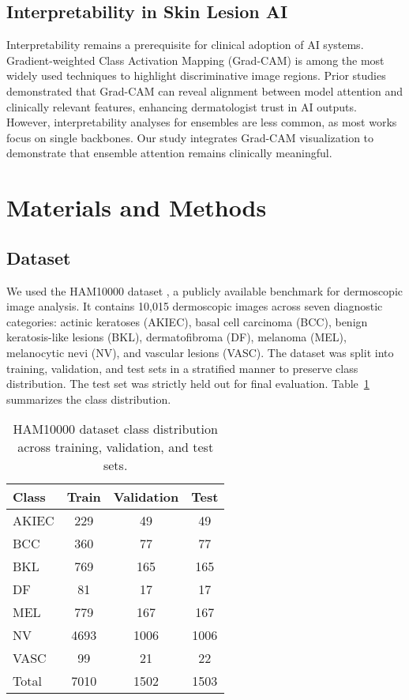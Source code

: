 \documentclass[preprint,12pt]{elsarticle}
\begin{document}
\subsection{Interpretability in Skin Lesion AI}
Interpretability remains a prerequisite for clinical adoption of AI systems. Gradient-weighted Class Activation Mapping (Grad-CAM) \citep{selvaraju2017gradcam} is among the most widely used techniques to highlight discriminative image regions. Prior studies demonstrated that Grad-CAM can reveal alignment between model attention and clinically relevant features, enhancing dermatologist trust in AI outputs. However, interpretability analyses for ensembles are less common, as most works focus on single backbones. Our study integrates Grad-CAM visualization to demonstrate that ensemble attention remains clinically meaningful.

\section{Materials and Methods}

\subsection{Dataset}
We used the HAM10000 dataset \citep{tschandl2018ham10000}, a publicly available benchmark for dermoscopic image analysis. It contains 10,015 dermoscopic images across seven diagnostic categories: actinic keratoses (AKIEC), basal cell carcinoma (BCC), benign keratosis-like lesions (BKL), dermatofibroma (DF), melanoma (MEL), melanocytic nevi (NV), and vascular lesions (VASC).  
The dataset was split into training, validation, and test sets in a stratified manner to preserve class distribution. The test set was strictly held out for final evaluation. Table~\ref{tab:dataset} summarizes the class distribution.

\begin{table}[htbp]
\centering
\caption{HAM10000 dataset class distribution across training, validation, and test sets.}
\label{tab:dataset}
\begin{tabular}{lccc}
\toprule
Class & Train & Validation & Test \\
\midrule
AKIEC & 229  & 49   & 49   \\
BCC   & 360  & 77   & 77   \\
BKL   & 769  & 165  & 165  \\
DF    & 81   & 17   & 17   \\
MEL   & 779  & 167  & 167  \\
NV    & 4693 & 1006 & 1006 \\
VASC  & 99   & 21   & 22   \\
\midrule
Total & 7010 & 1502 & 1503 \\
\bottomrule
\end{tabular}
\end{table}
\end{document}
